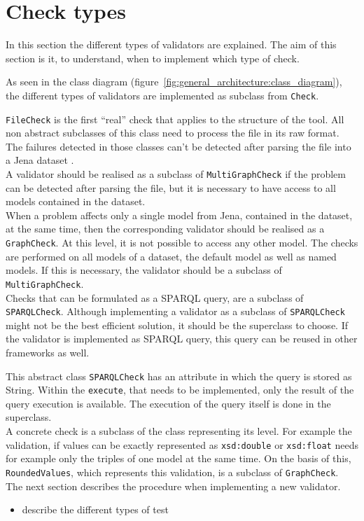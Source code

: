 \documentclass[11pt,a4paper]{article}
\newcommand{\function}[1]{\texttt{#1}}
\newcommand{\class}[1]{\texttt{#1}}
\begin{document}
\section{Check types}
\label{sec:check_types}
%
In this section the different types of validators are explained. 
The aim of this section is it, to understand, when to implement which type of check. 

As seen in the class diagram (figure~\ref{fig:general_architecture:class_diagram}), the different types of validators are implemented as subclass from \class{Check}. 

\class{FileCheck} is the first \enquote{real} check that applies to the structure of the tool. 
All non abstract subclasses of this class need to process the file in its raw format. 
The failures detected in those classes can't be detected after parsing the file into a Jena dataset \cite{apache_jena}. 
\\
A validator should be realised as a subclass of \class{MultiGraphCheck} if the problem can be detected after parsing the file, but it is necessary to have access to all models contained in the dataset. 
\\
When a problem affects only a single model from Jena, contained in the dataset, at the same time, then the corresponding validator should be realised as a \class{GraphCheck}. 
At this level, it is not possible to access any other model. 
The checks are performed on all models of a dataset, the default model as well as named models. 
If this is necessary, the validator should be a subclass of \class{MultiGraphCheck}. 
\\
Checks that can be formulated as a SPARQL query, are a subclass of \class{SPARQLCheck}. 
Although implementing a validator as a subclass of \class{SPARQLCheck} might not be the best efficient solution, it should be the superclass to choose. 
If the validator is implemented as SPARQL query, this query can be reused in other frameworks as well. 

This abstract class \class{SPARQLCheck} has an attribute in which the query is stored as String. 
Within the \function{execute}, that needs to be implemented, only the result of the query execution is available. 
The execution of the query itself is done in the superclass. 
\\
A concrete check is a subclass of the class representing its level. 
For example the validation, if values can be exactly represented as \texttt{xsd:double} or \texttt{xsd:float} needs for example only the triples of one model at the same time. 
On the basis of this, \class{RoundedValues}, which represents this validation, is a subclass of \class{GraphCheck}.  
\\
The next section describes the procedure when implementing a new validator. 
\begin{itemize}
	\item describe the different types of test	 
\end{itemize}
%
\end{document}
